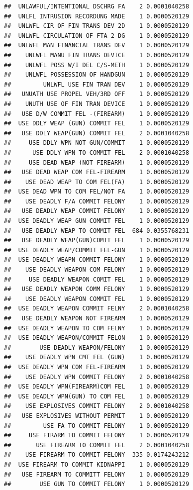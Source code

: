 \documentclass[]{book}
\begin{document}
\begin{verbatim}
##  UNLAWFUL/INTENTIONAL DSCHRG FA    2 0.0001040258
##  UNLFL INTRUSION RECORDUNG MADE    1 0.0000520129
##  UNLWFL CIR OF FIN TRANS DEV 2D    1 0.0000520129
##  UNLWFL CIRCULATION OF FTA 2 DG    1 0.0000520129
##  UNLWFL MAN FINANCIAL TRANS DEV    1 0.0000520129
##    UNLWFL MANU FIN TRANS DEVICE    1 0.0000520129
##    UNLWFL POSS W/I DEL C/S-METH    1 0.0000520129
##    UNLWFL POSSESSION OF HANDGUN    1 0.0000520129
##         UNLWFL USE FIN TRAN DEV    1 0.0000520129
##   UNUATH USE PROPEL VEH/3RD OFF    1 0.0000520129
##    UNUTH USE OF FIN TRAN DEVICE    1 0.0000520129
##   USE D/W COMMIT FEL -(FIREARM)    1 0.0000520129
##  USE DDLY WEAP (GUN) COMMIT FEL    1 0.0000520129
##   USE DDLY WEAP(GUN) COMMIT FEL    2 0.0001040258
##     USE DDLY WPN NOT GUN/COMMIT    1 0.0000520129
##      USE DDLY WPN TO COMMIT FEL    2 0.0001040258
##     USE DEAD WEAP (NOT FIREARM)    1 0.0000520129
##   USE DEAD WEAP COM FEL-FIREARM    1 0.0000520129
##    USE DEAD WEAP TO COM FEL(FA)    1 0.0000520129
##  USE DEAD WPN TO COM FEL/NOT FA    1 0.0000520129
##    USE DEADLY F/A COMMIT FELONY    1 0.0000520129
##   USE DEADLY WEAP COMMIT FELONY    1 0.0000520129
##  USE DEADLY WEAP GUN COMMIT FEL    1 0.0000520129
##   USE DEADLY WEAP TO COMMIT FEL  684 0.0355768231
##   USE DEADLY WEAP(GUN)COMIT FEL    1 0.0000520129
##  USE DEADLY WEAP/COMMIT FEL-GUN    1 0.0000520129
##  USE DEADLY WEAPN COMMIT FELONY    1 0.0000520129
##    USE DEADLY WEAPON COM FELONY    1 0.0000520129
##     USE DEADLY WEAPON COMIT FEL    1 0.0000520129
##   USE DEADLY WEAPON COMM FELONY    1 0.0000520129
##    USE DEADLY WEAPON COMMIT FEL    1 0.0000520129
##  USE DEADLY WEAPON COMMIT FELNY    2 0.0001040258
##   USE DEADLY WEAPON NOT FIREARM    1 0.0000520129
##  USE DEADLY WEAPON TO COM FELNY    1 0.0000520129
##  USE DEADLY WEAPON/COMMIT FELON    1 0.0000520129
##        USE DEADLY WEAPON/FELONY    1 0.0000520129
##    USE DEADLY WPN CMT FEL (GUN)    1 0.0000520129
##  USE DEADLY WPN COM FEL-FIREARM    1 0.0000520129
##    USE DEADLY WPN COMMIT FELONY    2 0.0001040258
##  USE DEADLY WPN(FIREARM)COM FEL    1 0.0000520129
##  USE DEADLY WPN(GUN) TO COM FEL    1 0.0000520129
##    USE EXPLOSIVES COMMIT FELONY    2 0.0001040258
##   USE EXPLOSIVES WITHOUT PERMIT    1 0.0000520129
##         USE FA TO COMMIT FELONY    1 0.0000520129
##     USE FIRARM TO COMMIT FELONY    1 0.0000520129
##       USE FIREARM TO COMMIT FEL    2 0.0001040258
##    USE FIREARM TO COMMIT FELONY  335 0.0174243212
##  USE FIREARM TO COMMIT KIDNAPPI    1 0.0000520129
##   USE FIREARM TO COMMITT FELONY    1 0.0000520129
##        USE GUN TO COMMIT FELONY    1 0.0000520129

\end{verbatim}
\end{document}
